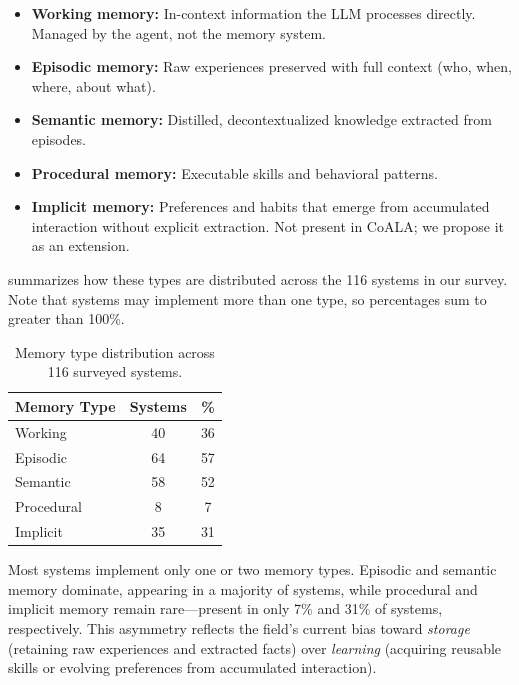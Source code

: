 \begin{itemize}[leftmargin=*, nosep]
    \item \textbf{Working memory:} In-context information the LLM
    processes directly. Managed by the agent, not the memory system.
    \item \textbf{Episodic memory:} Raw experiences preserved with
    full context (who, when, where, about what).
    \item \textbf{Semantic memory:} Distilled, decontextualized
    knowledge extracted from episodes.
    \item \textbf{Procedural memory:} Executable skills and
    behavioral patterns.
    \item \textbf{Implicit memory:} Preferences and habits that
    emerge from accumulated interaction without explicit extraction.
    Not present in CoALA; we propose it as an extension.
\end{itemize}

 summarizes how these types are distributed
across the 116 systems in our survey. Note that systems may implement
more than one type, so percentages sum to greater than 100\%.

\begin{table}[t]
    \centering
    \caption{Memory type distribution across 116 surveyed systems.}
    \label{tab:memory-type-dist}
    \begin{tabular}{lcc}
        \toprule
        \textbf{Memory Type} & \textbf{Systems} & \textbf{\%} \\
        \midrule
        Working      & 40 & 36 \\
        Episodic     & 64 & 57 \\
        Semantic     & 58 & 52 \\
        Procedural   &  8 &  7 \\
        Implicit     & 35 & 31 \\
        \bottomrule
    \end{tabular}
\end{table}

Most systems implement only one or two memory types.
Episodic and semantic memory dominate, appearing in a majority of
systems, while procedural and implicit memory remain rare---present in
only 7\% and 31\% of systems, respectively.
This asymmetry reflects the field's current bias toward
\emph{storage} (retaining raw experiences and extracted facts) over
\emph{learning} (acquiring reusable skills or evolving preferences from
accumulated interaction).

